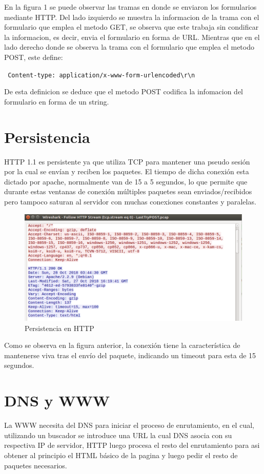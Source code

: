\documentclass[12pt,a4paper]{article}
\begin{document}
	En la figura 1 se puede observar las tramas en donde se enviaron los formularios mediante HTTP. Del lado izquierdo se muestra la informacion de la trama con el formulario que emplea el metodo GET, se observa que este trabaja sin condificar la informacion, es decir, envia el formulario en forma de URL. Mientras que en el lado derecho donde se observa la trama con el formulario que emplea el metodo POST, este define:
	
	\verb| Content-type: application/x-www-form-urlencoded\r\n|
	
	De esta definicion se deduce que el metodo POST codifica la infomacion del formulario en forma de un string.
	
	\section{Persistencia}
	HTTP 1.1 es persistente ya que utiliza TCP para mantener una pseudo sesión por la cual se envían y reciben los paquetes. El tiempo de dicha conexión esta dictado por apache, normalmente van de 15 a 5 segundos, lo que permite que durante estas ventanas de conexión múltiples paquetes sean enviados/recibidos pero tampoco saturan al servidor con muchas conexiones constantes y paralelas.
	
	\begin{figure}[H]
		\includegraphics[width=\linewidth]{crop.png}
		\caption{Persistencia en HTTP}
		\label{fig:img2}
	\end{figure}
	
	Como se observa en la figura anterior, la conexión tiene la característica de mantenerse viva tras el envío del paquete, indicando un timeout para esta de 15 segundos.
	\section{DNS y WWW}
	La WWW necesita del DNS para iniciar el proceso de enrutamiento, en el cual, utilizando un buscador se introduce una URL la cual DNS asocia con su respectiva IP de servidor, HTTP luego procesa el resto del enrutamiento para asi obtener al principio el HTML básico de la pagina y luego pedir el resto de paquetes necesarios.
	
\end{document}
